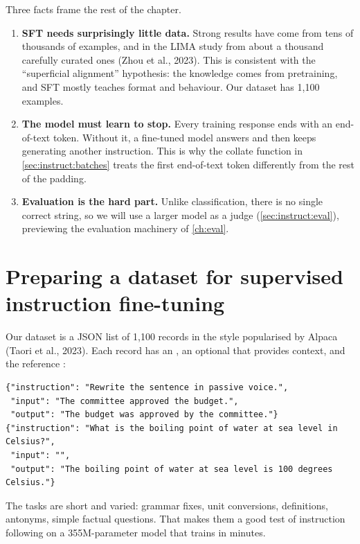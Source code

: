Three facts frame the rest of the chapter.
\begin{enumerate}
\item \textbf{SFT needs surprisingly little data.} Strong results have come from tens of
thousands of examples, and in the LIMA study from about a thousand carefully curated
ones (Zhou et al., 2023). This is consistent with the ``superficial alignment''
hypothesis: the knowledge comes from pretraining, and SFT mostly teaches format and
behaviour. Our dataset has 1{,}100 examples.
\item \textbf{The model must learn to stop.} Every training response ends with an
end-of-text token. Without it, a fine-tuned model answers and then keeps generating
another instruction. This is why the collate function in \cref{sec:instruct:batches}
treats the first end-of-text token differently from the rest of the padding.
\item \textbf{Evaluation is the hard part.} Unlike classification, there is no single
correct string, so we will use a larger model as a judge (\cref{sec:instruct:eval}),
previewing the evaluation machinery of \cref{ch:eval}.
\end{enumerate}

\section{Preparing a dataset for supervised instruction fine-tuning}\label{sec:instruct:data}

Our dataset is a JSON list of 1{,}100 records in the style popularised by
Alpaca (Taori et al., 2023). Each record has an , an optional  that provides
context, and the reference :

\begin{lstlisting}[style=plain]
{"instruction": "Rewrite the sentence in passive voice.",
 "input": "The committee approved the budget.",
 "output": "The budget was approved by the committee."}
{"instruction": "What is the boiling point of water at sea level in Celsius?",
 "input": "",
 "output": "The boiling point of water at sea level is 100 degrees Celsius."}
\end{lstlisting}

The tasks are short and varied: grammar fixes, unit conversions, definitions,
antonyms, simple factual questions. That makes them a good test of instruction
following on a 355M-parameter model that trains in minutes.

